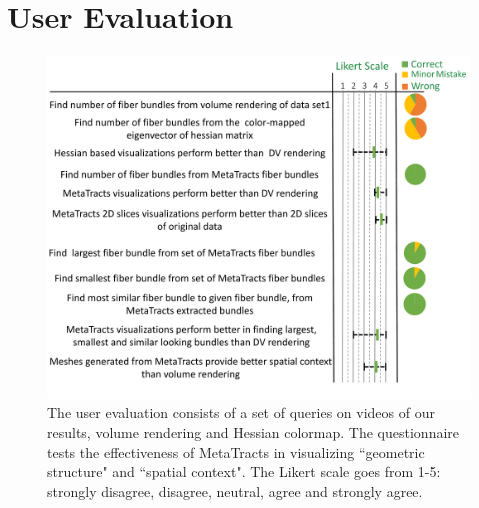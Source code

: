 \section {User Evaluation}
\label {sec:user_eval}
\begin{figure}[tb]
	\centering
	\includegraphics[width=\linewidth,  trim = 0mm 30mm 0mm 0mm, clip]{images_pvis/usereval.pdf}
	\caption{The user evaluation consists of a set of queries on videos of our results, volume rendering and Hessian colormap. The questionnaire tests the effectiveness of MetaTracts in visualizing ``geometric structure" and ``spatial context". The Likert scale goes from 1-5: strongly disagree, disagree, neutral, agree and strongly agree. }
	\label{fig:userstudy}
\end{figure}
